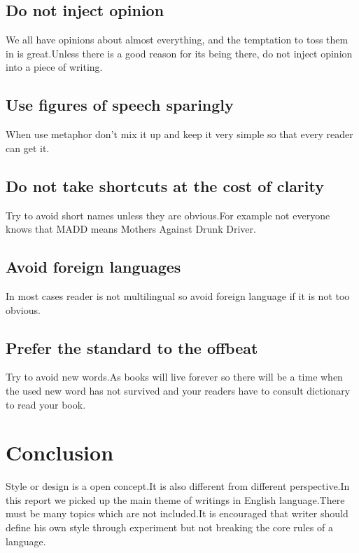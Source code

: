 \documentclass{report}
\begin{document}
\section{Do not inject opinion}
We all have opinions about almost everything, and the temptation to toss them in is great.Unless there is a good reason for its being there, do not inject opinion into a piece of writing. 
\section{Use figures of speech sparingly}
When use metaphor don't mix it up and keep it very simple so that every reader can get it.
\section{Do not take shortcuts at the cost of clarity}
Try to avoid short names unless they are obvious.For example not everyone knows that MADD means
Mothers Against Drunk Driver.
\section{Avoid foreign languages}
In most cases reader is not multilingual so avoid foreign language if it is not too obvious.
\section{Prefer the standard to the offbeat}
Try to avoid new words.As books will live forever so there will be a time when the used new word has not survived and your readers have to consult dictionary to read your book.
\chapter{Conclusion}\label{sec:Conclusion}
Style or design is a open concept.It is also different from different perspective.In this report we picked up the main theme of writings in English language.There must be many topics which are not included.It is encouraged that writer should define his own style through experiment but not breaking the core rules of a language.
 
\end{document}
